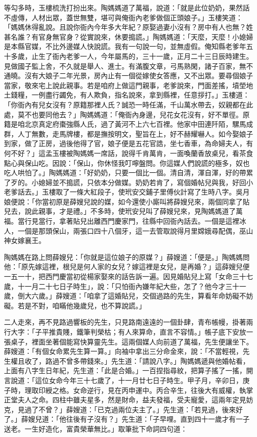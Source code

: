 等勾多時，玉樓梳洗打扮出來。陶媽媽道了萬福，說道：「就是此位奶奶，果然話不虛傳，人材出眾，蓋世無雙，堪可與俺衙內老爹做個正頭娘子。」玉樓笑道： 「媽媽休得亂說。且說你衙內今年多大年紀？原娶過妻小沒有？房中有人也無？姓甚名誰？有官身無官身？從實說來，休要搗謊。」陶媽媽道：「天麼，天麼！小媳婦是本縣官媒，不比外邊媒人快說謊。我有一句說一句，並無虛假。俺知縣老爹年五十多歲，止生了衙內老爹一人，今年屬馬的，三十一歲，正月二十三日辰時建生。見做國子監上舍，不久就是舉人、進士。有滿腹文章，弓馬熟閑，諸子百家，無不通曉。沒有大娘子二年光景，房內止有一個從嫁使女答應，又不出眾。要尋個娘子當家，敬來宅上說此親事。若是咱府上做這門親事，老爹說來，門面差搖，墳塋地土錢糧，一例盡行蠲免，有人欺負，指名說來，拿到縣裡，任意拶打。」玉樓道：「你衙內有兒女沒有？原籍那裡人氏？誠恐一時任滿，千山萬水帶去，奴親都在此處，莫不也要同他去？」陶媽媽道：「俺衙內身邊，兒花女花沒有，好不單徑。原籍是咱北京真定府棗強縣人氏，過了黃河不上六七百裡。他家中田連阡陌，騾馬成群，人丁無數，走馬牌樓，都是撫按明文，聖旨在上，好不赫耀嚇人。如今娶娘子到家，做了正房，過後他得了官，娘子便是五花官誥，坐七香車，為命婦夫人，有何不好？」這孟玉樓被陶媽媽一席話，說得千肯萬肯，一面喚蘭香放桌兒，看茶食點心與保山吃。因說：「保山，你休怪我叮嚀盤問。你這媒人們說謊的極多，奴也吃人哄怕了。」陶媽媽道：「好奶奶，只要一個比一個。清自清，渾自渾，好的帶累了歹的。小媳婦並不搗謊，只依本分做媒。奶奶若肯了，寫個婚帖兒與我，好回小老爹話去。」玉樓取了一條大紅段子，使玳安交鋪子里傅伙計寫了生時八字。吳月娘便說：「你當初原是薛嫂兒說的媒，如今還使小廝叫將薛嫂兒來，兩個同拿了貼兒去，說此親事，才是禮。」不多時，使玳安兒叫了薛嫂兒來，見陶媽媽道了萬福。當行見當行，拿著貼兒出離西門慶家門，往縣中回衙內話去。一個是這裡冰人，一個是那頭保山，兩張口四十八個牙，這一去管取說得月里嫦娥尋配偶，巫山神女嫁襄王。

陶媽媽在路上問薛嫂兒：「你就是這位娘子的原媒？」薛嫂道：「便是。」陶媽媽問他：「原先嫁這裡，根兒是何人家的女兒？嫁這裡是女兒，是再婚？」這薛嫂兒便一五一十，把西門慶當初從楊家娶來的話告訴一遍。因見婚貼兒上寫「女命三十七歲，十一月二十七日子時生」，說：「只怕衙內嫌年紀大些，怎了？他今才三十一歲，倒大六歲。」薛嫂道：「咱拿了這婚貼兒，交個過路的先生，算看年命妨礙不妨礙。若是不對，咱瞞他幾歲兒，也不算說謊。」

二人走來，再不見路過響板的先生，只見路南遠遠的一個卦肆，青布帳幔，掛著兩行大字：「子平推貴賤，鐵筆判榮枯；有人來算命，直言不容情。」帳子底下安放一張桌子，裡面坐著個能寫快算靈先生。這兩個媒人向前道了萬福，先生便讓坐下。薛嫂道：「有個女命累先生算一算。」向袖中拿出三分命金來，說：「不當輕視，先生權且收了，路過不曾多帶錢來。」先生道：「請說八字。」陶媽媽遞與他婚帖看，上面有八字生日年紀，先生道：「此是合婚。」一百捏指尋紋，把算子搖了一搖，開言說道：「這位女命今年三十七歲了，十一月廿七日子時生。甲子月，辛卯日，庚子時，理取印綬之格。女命逆行，見在丙申運中。丙合辛生，往後大有威權，執掌正堂夫人之命。四柱中雖夫星多，然是財命，益夫發福，受夫寵愛，這兩年定見妨克，見過了不曾？」薛嫂道：「已克過兩位夫主了。」先生道：「若見過，後來好了。」薛嫂兒道：「他往後有子沒有？」先生道：「子早哩。直到四十一歲才有一子送老。一生好造化，富貴榮華無比。」取筆批下命詞四句道：

